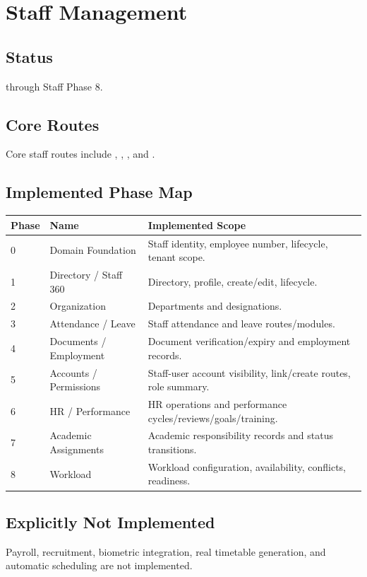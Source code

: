 \chapter{Staff Management}

\section{Status}
\implemented{} through Staff Phase 8.

\section{Core Routes}
Core staff routes include , , , and .

\section{Implemented Phase Map}
\begin{longtable}{@{}p{}p{}p{}@{}}
\toprule
\textbf{Phase} & \textbf{Name} & \textbf{Implemented Scope}\\
\midrule
0 & Domain Foundation & Staff identity, employee number, lifecycle, tenant scope.\\
1 & Directory / Staff 360 & Directory, profile, create/edit, lifecycle.\\
2 & Organization & Departments and designations.\\
3 & Attendance / Leave & Staff attendance and leave routes/modules.\\
4 & Documents / Employment & Document verification/expiry and employment records.\\
5 & Accounts / Permissions & Staff-user account visibility, link/create routes, role summary.\\
6 & HR / Performance & HR operations and performance cycles/reviews/goals/training.\\
7 & Academic Assignments & Academic responsibility records and status transitions.\\
8 & Workload & Workload configuration, availability, conflicts, readiness.\\
\bottomrule
\end{longtable}

\section{Explicitly Not Implemented}
Payroll, recruitment, biometric integration, real timetable generation, and automatic scheduling are not implemented.
